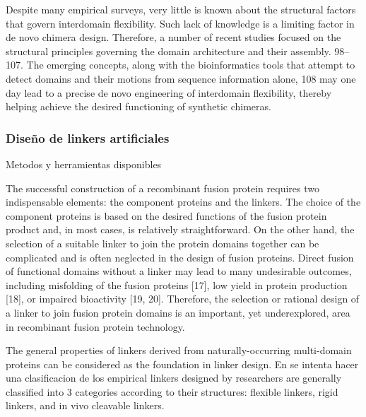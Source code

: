 Despite many empirical surveys, very little is known about the structural factors that govern interdomain flexibility. 
Such lack of knowledge is a limiting factor in de novo chimera design. Therefore, a number of recent studies focused on the structural principles governing the domain architecture and their assembly. 98–107. The emerging concepts, along
with the bioinformatics tools that attempt to detect domains and their motions from sequence information alone, 108 may one day lead to a precise de novo engineering of interdomain flexibility, thereby helping
achieve the desired functioning of synthetic chimeras.
  

  
\subsubsection{Diseño de linkers artificiales}
Metodos y herramientas disponibles


The successful construction of a recombinant fusion protein requires two indispensable
elements: the component proteins and the linkers. The choice of the component proteins is
based on the desired functions of the fusion protein product and, in most cases, is relatively
straightforward. On the other hand, the selection of a suitable linker to join the protein
domains together can be complicated and is often neglected in the design of fusion proteins.
Direct fusion of functional domains without a linker may lead to many undesirable
outcomes, including misfolding of the fusion proteins [17], low yield in protein production
[18], or impaired bioactivity [19, 20]. Therefore, the selection or rational design of a linker
to join fusion protein domains is an important, yet underexplored, area in recombinant
fusion protein technology.

The general properties of linkers derived from naturally-occurring multi-domain proteins can be considered as the foundation in linker design. 
En \cite{chen2013fusion} se intenta hacer una clasificacion de los empirical linkers designed by researchers are generally classified into 3 categories according to their structures: flexible linkers, rigid linkers, and in vivo cleavable linkers. 


